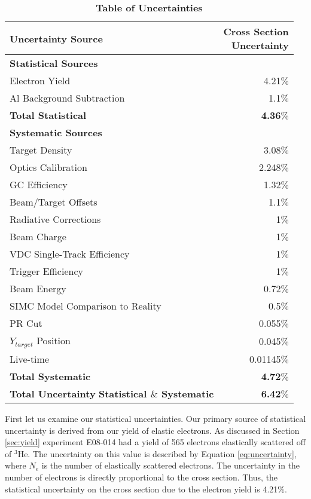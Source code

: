 \begin{table}[!h]
\centering
\begin{tabular}{|l | r |}
\hline
\textbf{Uncertainty Source} & \makecell{\textbf{Cross Section}\\ \textbf{Uncertainty}} \\
\hline
\textbf{Statistical Sources} &  \\ 
\hline
Electron Yield & 4.21$\%$\\
Al Background Subtraction & 1.1$\%$\\
\textbf{Total Statistical} &  \textbf{4.36$\%$}\\
\hline
\textbf{Systematic Sources} &  \\
\hline
Target Density & 3.08$\%$\\
Optics Calibration & 2.248$\%$\\
GC Efficiency & 1.32$\%$\\
Beam/Target Offsets & 1.1$\%$\\
Radiative Corrections & 1$\%$\\
Beam Charge & 1$\%$\\
VDC Single-Track Efficiency & 1$\%$\\
Trigger Efficiency & 1$\%$\\
Beam Energy & 0.72$\%$\\
SIMC Model Comparison to Reality & 0.5$\%$\\
PR Cut & 0.055$\%$\\ 
$Y_{target}$ Position & 0.045$\%$\\
Live-time & 0.01145$\%$\\
\textbf{Total Systematic} &  \textbf{4.72$\%$}\\
\hline
\makecell{\textbf{Total Uncertainty}\\ \textbf{Statistical $\&$ Systematic}} &  \textbf{6.42$\%$}\\
\hline
\end{tabular}
\caption[Table of Uncertainties]{{\bf{Table of Uncertainties}} }
\label{tab:uncertainty}
\end{table}

First let us examine our statistical uncertainties. Our primary source of statistical uncertainty is derived from our yield of elastic electrons. As discussed in Section \ref{sec:yield} experiment E08-014 had a yield of 565 electrons elastically scattered off of $^3$He. The uncertainty on this value is described by Equation \ref{eq:uncertainty}, where $N_e$ is the number of elastically scattered electrons. The uncertainty in the number of electrons is directly proportional to the cross section. Thus, the statistical uncertainty on the cross section due to the electron yield is 4.21$\%$.

